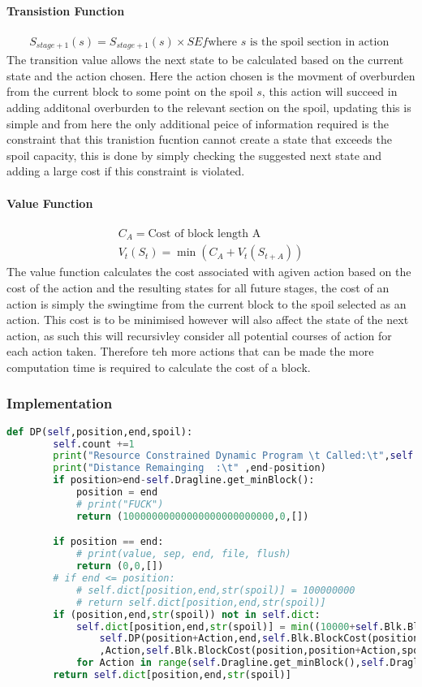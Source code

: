 \paragraph*{Transistion Function}
\begin{align}
\label{Transition}
S_{stage+1}(s)=S_{stage+1}(s)\times SEf  \text{where $s$ is the spoil section in action }
\end{align}
The transition value allows the next state to be calculated based on the current state and the action chosen. Here the action chosen is the movment of overburden from the current block to some point on the spoil $s$, this action will succeed in adding additonal overburden to the relevant section on the spoil, updating this is simple and from here the only additional peice of information required is the constraint that this tranistion fucntion cannot create a state that exceeds the spoil capacity, this is done by simply checking the suggested next state and adding a large cost if this constraint is violated. 
\paragraph*{Value Function}
\begin{align}
\label{value}
C_A = \text{Cost of block length A}\\
V_t(S_t) = \min (C_A+V_t(S_{t+A}))
\end{align}
The value function calculates the cost associated with agiven action based on the cost of the action and the resulting states for all future stages, the cost of an action is simply the swingtime from the current block to the spoil selected as an action. This cost is to be minimised however will also affect the state of the next action, as such this will recursivley consider all potential courses of action for each action taken. Therefore teh more actions that can be made the more computation time is required to calculate the cost of a block. 
\subsubsection{Implementation}
\begin{lstlisting}[language = python]
	def DP(self,position,end,spoil):
		self.count +=1
		print("Resource Constrained Dynamic Program \t Called:\t",self.count,'  times')
		print("Distance Remainging  :\t" ,end-position)
		if position>end-self.Dragline.get_minBlock():
			position = end
			# print("FUCK")
			return (10000000000000000000000000,0,[])

		if position == end:
			# print(value, sep, end, file, flush)
			return (0,0,[])
		# if end <= position:
			# self.dict[position,end,str(spoil)] = 100000000
			# return self.dict[position,end,str(spoil)]
		if (position,end,str(spoil)) not in self.dict:
			self.dict[position,end,str(spoil)] = min((10000+self.Blk.BlockCost(position,position+Action,spoil)[0]+
				self.DP(position+Action,end,self.Blk.BlockCost(position,position+Action,spoil)[1])[0]
				,Action,self.Blk.BlockCost(position,position+Action,spoil)[1])
			for Action in range(self.Dragline.get_minBlock(),self.Dragline.get_maxBlock()))
		return self.dict[position,end,str(spoil)]

\end{lstlisting}

